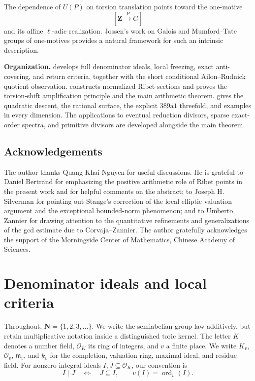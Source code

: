 \documentclass[11pt,letterpaper,reqno]{amsart}
\theoremstyle{definition}
\theoremstyle{remark}
\newcommand{\Z}{\mathbf Z}
\newcommand{\N}{\mathbf N}
\newcommand{\OK}{\mathcal O_K}
\newcommand{\ord}{\operatorname{ord}}
\newcommand{\cO}{\mathcal O}
\begin{document}
The dependence of $U(P)$ on torsion translation points toward the one-motive
\[
 [\Z\xrightarrow{P}G]
\]
and its affine $\ell$-adic realization.  Jossen's work on Galois and
Mumford--Tate groups of one-motives \cite{Jossen2014} provides a natural framework for such an
intrinsic description.


\medskip
\noindent\textbf{Organization.}
 develops full denominator ideals, local freezing,
exact anti-covering, and return criteria, together with the short conditional
Ailon--Rudnick quotient observation.   constructs normalized
Ribet sections and proves the torsion-shift amplification principle and the
main arithmetic theorem.   gives the quadratic descent,
the rational surface, the explicit $389\mathrm a1$ threefold, and examples in
every dimension.  The applications to eventual reduction divisors, sparse
exact-order spectra, and primitive divisors are developed alongside the main
theorem.

\subsection*{Acknowledgements}
The author thanks Quang-Khai Nguyen for useful discussions.  He is grateful to
Daniel Bertrand for emphasizing the positive arithmetic role of Ribet points
in the present work and for helpful comments on the abstract; to Joseph H.
Silverman for pointing out Stange's correction of the local elliptic valuation
argument and the exceptional bounded-norm phenomenon; and to Umberto Zannier
for drawing attention to the quantitative refinements and generalizations of
the gcd estimate due to Corvaja--Zannier.  The author gratefully acknowledges
the support of the Morningside Center of Mathematics, Chinese Academy of
Sciences. 

\section{Denominator ideals and local criteria}
\label{sec:denominators}

Throughout, $\N=\{1,2,3,\ldots\}$.  We write the semiabelian group law
additively, but retain multiplicative notation inside a distinguished toric
kernel.  The letter $K$ denotes a number field, $\OK$ its ring of integers,
and $v$ a finite place.  We write
$K_v$, $\cO_v$, $\mathfrak m_v$, and $k_v$ for the completion, valuation
ring, maximal ideal, and residue field.  For nonzero integral ideals
$I,J\subseteq\OK$, our convention is
\[
 I\mid J\quad\Longleftrightarrow\quad J\subseteq I,
 \qquad v(I)=\ord_v(I).
\]
\end{document}
